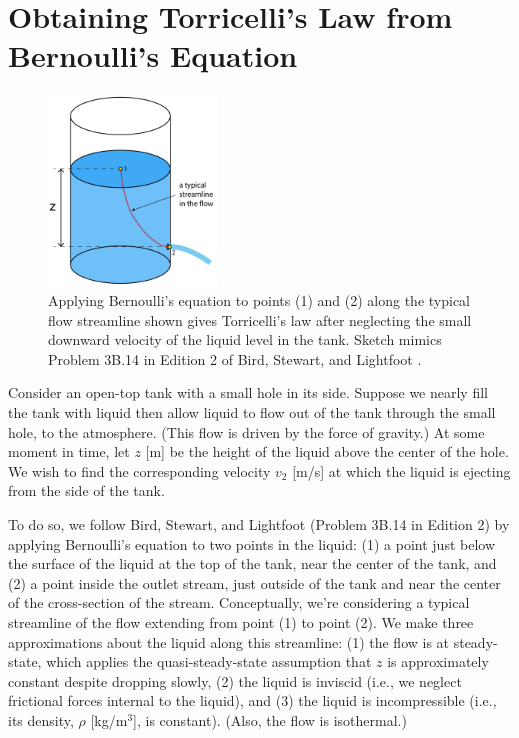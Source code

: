 \documentclass[a4paper,fleqn]{cas-sc}
\begin{document}
\section{Obtaining Torricelli's Law from Bernoulli's Equation}

\begin{figure}
	\centering
	\includegraphics[width=0.4\textwidth]{../drawings_and_photos/torricelli_illustration.pdf}
	\caption{Applying Bernoulli's equation to points (1) and (2) along the typical flow streamline shown gives Torricelli's law after neglecting the small downward velocity of the liquid level in the tank. Sketch mimics Problem 3B.14 in Edition 2 of Bird, Stewart, and Lightfoot \cite{bsl_book}.}
\end{figure}

	Consider an open-top tank with a small hole in its side. Suppose we nearly fill the tank with liquid then allow liquid to flow out of the tank through the small hole, to the atmosphere. (This flow is driven by the force of gravity.)
	At some moment in time, let $z$ [m] be the height of the liquid above the center of the hole. 
	We wish to find the corresponding velocity $v_2$ [m/s] at which the liquid is ejecting from the side of the tank. 
	
	To do so, we follow Bird, Stewart, and Lightfoot \cite{bsl_book} (Problem 3B.14 in Edition 2) by applying Bernoulli's equation to two points in the liquid: 
	(1) a point just below the surface of the liquid at the top of the tank, near the center of the tank, and 
	(2) a point inside the outlet stream, just outside of the tank and near the center of the cross-section of the stream. 
	 Conceptually, we're considering a typical streamline of the flow extending from point (1) to point (2).
	We make three approximations about the liquid along this streamline: 
	(1) the flow is at steady-state, which applies the quasi-steady-state assumption that $z$ is approximately constant despite dropping slowly,
	(2) the liquid is inviscid (i.e., we neglect frictional forces internal to the liquid),
	and
	(3) the liquid is incompressible (i.e., its density, $\rho$ [kg/m$^3$], is constant).
	(Also, the flow is isothermal.)
	
\end{document}
